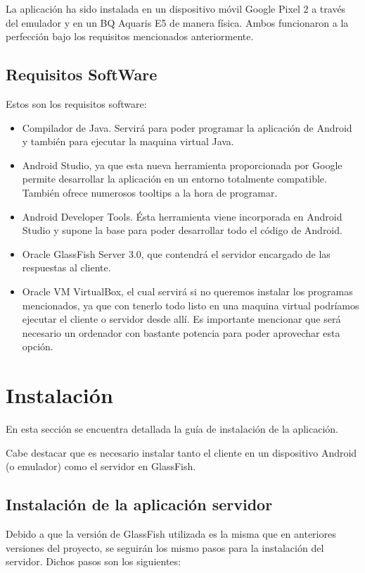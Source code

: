 La aplicación ha sido instalada en un dispositivo móvil Google Pixel 2 a través del emulador y en un BQ Aquaris E5 de manera física. Ambos funcionaron a la perfección bajo los requisitos mencionados anteriormente.  

\subsection{Requisitos SoftWare}

Estos son los requisitos software:

\begin{itemize}
\item Compilador de Java. Servirá para poder programar la aplicación de Android y también para ejecutar la maquina virtual Java.
\item Android Studio, ya que esta nueva herramienta proporcionada por Google permite desarrollar la aplicación en un entorno totalmente compatible. También ofrece numerosos tooltips a la hora de programar.
\item Android Developer Tools. Ésta herramienta viene incorporada en Android Studio y supone la base para poder desarrollar todo el código de Android.
\item Oracle GlassFish Server 3.0, que contendrá el servidor encargado de las respuestas al cliente.
\item Oracle VM VirtualBox, el cual servirá si no queremos instalar los programas mencionados, ya que con tenerlo todo listo en una maquina virtual podríamos ejecutar el cliente o servidor desde allí. Es importante mencionar que será necesario un ordenador con bastante potencia para poder aprovechar esta opción.
\end{itemize}

\section{Instalación}

En esta sección se encuentra detallada la guía de instalación de la aplicación.

Cabe destacar que es necesario instalar tanto el cliente en un dispositivo Android (o emulador) como el servidor en GlassFish.

\subsection{Instalación de la aplicación servidor}

Debido a que la versión de GlassFish utilizada es la misma que en anteriores versiones del proyecto, se seguirán los mismo pasos para la instalación del servidor. Dichos pasos son los siguientes:

